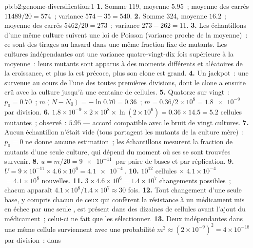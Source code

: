 \begin{solution}{pb:b2:genome-diversification:1}
\textbf{1.} Somme 119, moyenne $5.95$~; moyenne des carrés
$11489/20 = 574$~; variance $574 - 35 = 540$.
\textbf{2.} Somme 324, moyenne $16.2$~; moyenne des carrés
$5462/20 = 273$~; variance $273 - 262 = 11$.
\textbf{3.} Les échantillons d'une même culture suivent une loi de
Poisson (variance proche de la moyenne)~: ce sont des tirages au hasard
dans une même fraction fixe de mutants. Les cultures indépendantes ont
une variance quatre-vingt-dix fois supérieure à la moyenne~: leurs
mutants sont apparus à des moments différents et aléatoires de la
croissance, et plus la  est précoce, plus son clone est grand.
\textbf{4.} Un jackpot~: une  survenue au cours de l'une des
toutes premières divisions, dont le clone a ensuite crû avec la culture
jusqu'à une centaine de cellules.
\textbf{5.} Quatorze sur vingt~: $p_0 = 0.70$~; $m(N - N_0) = -\ln 0.70
= 0.36$~; $m = 0.36/2\times 10^{8} = \qty{1.8e-9}{}$ par division.
\textbf{6.} $1.8\times 10^{-9}\times 2\times 10^{8}\times \ln(2\times
10^{6}) = 0.36\times 14.5 = 5.2$ cellules mutantes~; observé~: $5.95$
--- accord compatible avec le bruit de vingt cultures.
\textbf{7.} Aucun échantillon n'était vide (tous partagent les mutants
de la culture mère)~: $p_0 = 0$ ne donne aucune estimation~; les
échantillons mesurent la fraction de mutants d'une seule culture, qui
dépend du moment où ses  se sont trouvées survenir.
\textbf{8.} $u = m/20 = \qty{9e-11}{}$ par paire de bases et par
réplication.
\textbf{9.} $U = 9\times 10^{-11}\times 4.6\times 10^{6} =
\qty{4.1e-4}{}$.
\textbf{10.} $10^{12}$ cellules $\times$ $4.1\times 10^{-4}$ $= 4.1\times
10^{8}$  nouvelles.
\textbf{11.} $3\times 4.6\times 10^{6} = 1.4\times 10^{7}$ changements
possibles~; chacun apparaît $4.1\times 10^{8}/1.4\times 10^{7} \approx 30$
fois.
\textbf{12.} Tout changement d'une seule base, y compris chacun de ceux
qui confèrent la résistance à un médicament mis en échec par une seule
, est présent dans des dizaines de cellules avant l'ajout du
médicament~; celui-ci ne fait que les sélectionner.
\textbf{13.} Deux  indépendantes dans une même cellule
surviennent avec une probabilité $m^2 \approx (2\times 10^{-9})^2 = 4\times 10^{-18}$ par division~: dans

\end{solution}
